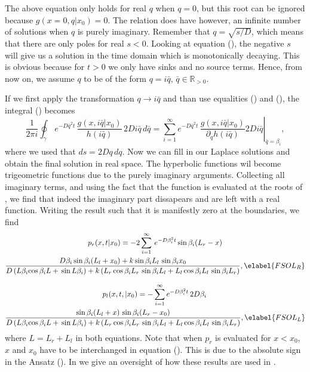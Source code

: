 The above equation only holds for real $q$ when $q = 0$, but this root can be ignored because $g(x=0,q|x_0) = 0$. The relation does have however, an infinite number of solutions when $q$ is purely imaginary. Remember that $q = \sqrt{s/D}$, which means that there are only poles for real $s < 0$. Looking at equation (), the negative $s$ will give us a solution in the time domain which is monotonically decaying. This is obvious because for $t > 0$ we only have sinks and no source terms. Hence, from now on, we assume $q$ to be of the form $q = i \bar{q}, \, \bar{q} \in \mathbb{R}_{>0}$.

If we first apply the transformation $q \rightarrow i \bar{q}$ and than use equalities () and (), the integral () becomes
\begin{equation} 
 \frac{1}{2 \pi i} \oint_{\gamma}
 \, e^{- D \bar{q}^2 t} \, \frac{g(x,i \bar{q}|x_0)}{h(i \bar{q})} \, 2 D i \bar{q} \, d\bar{q} = \sum_{i=1}^{\infty} e^{ - D \bar{q}^2 t} \, \left. \frac{g(x,i \bar{q}|x_0)}{\partial_q h(i \bar{q})} 2 D i \bar{q} \right|_{\bar{q} = \beta_i},
\end{equation}
where we used that $ds = 2Dq\,dq$. Now we can fill in our Laplace solutions and obtain the final solution in real space. The hyperbolic functions wil become trigeometric functions due to the purely imaginary arguments. Collecting all imaginary terms, and using the fact that the function is evaluated at the roots of , we find that indeed the imaginary part dissapears and are left with a real function. Writing the result such that it is manifestly zero at the boundaries, we find
\begin{multline}
 p_r(x,t|x_0) = -2 \sum_{i=1}^{\infty} \, e^{- D \beta_i ^2 t} \, \mathrm{sin} \, \beta_i (L_r - x) \\ 
\frac{D \beta_i \, \mathrm{sin} \, \beta_i (L_l + x_0) + k \, \mathrm{sin} \, \beta_i L_l \,\, \mathrm{sin} \, \beta_i x_0}{D \, (L \beta_i \mathrm{cos} \, \beta_i L + \, \mathrm{sin} \, L \beta_i ) + k \,( L_r \, \mathrm{cos} \, \beta_i L_r \,\, \mathrm{sin} \, \beta_i L_l + L_l \, \mathrm{cos} \, \beta_i L_l \,\, \mathrm{sin} \, \beta_i L_r )},
 \elabel{FSOL_R}
\end{multline}

\begin{multline}
 p_l(x,t,|x_0) = -\sum_{i=1}^{\infty} e^{- D \beta_i ^2 t} \, 2 D \beta_i \, \\ 
\frac{\mathrm{sin} \, \beta_i (L_l + x) \,\, \mathrm{sin} \, \beta_i (L_r - x_0)}{D \, (L \beta_i \mathrm{cos} \, \beta_i L + \, \mathrm{sin} \, L \beta_i ) + k \,( L_r \, \mathrm{cos} \, \beta_i L_r \,\, \mathrm{sin} \, \beta_i L_l + L_l \, \mathrm{cos} \, \beta_i L_l \,\, \mathrm{sin} \, \beta_i L_r )},
\elabel{FSOL_L}
\end{multline}
where $L=L_r + L_l$ in both equations. Note that when $p_r$ is evaluated for $x<x_0$, $x$ and $x_0$ have to be interchanged in equation (). This is due to the absolute sign in the Ansatz (). In  we give an oversight of how these results are used in \GFRD.


